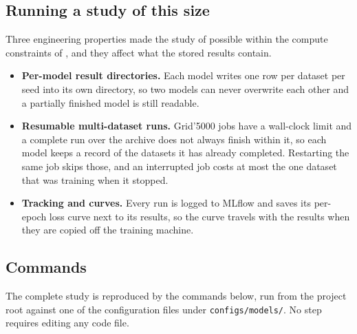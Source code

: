 
\subsection{Running a study of this size}
\label{app:engineering}

Three engineering properties made the study of  possible within the compute
constraints of , and they affect what the stored results contain.

\begin{itemize}\itemsep2pt
  \item \textbf{Per-model result directories.} Each model writes one row per dataset per seed into
        its own directory, so two models can never overwrite each other and a partially finished
        model is still readable.
  \item \textbf{Resumable multi-dataset runs.} Grid'5000 jobs have a wall-clock limit and a
        complete run over the archive does not always finish within it, so each model keeps a record of the datasets it has
        already completed. Restarting the same job skips those, and an interrupted job costs at most
        the one dataset that was training when it stopped.
  \item \textbf{Tracking and curves.} Every run is logged to MLflow and saves its per-epoch loss
        curve next to its results, so the curve travels with the results when they are copied off
        the training machine.
\end{itemize}

\subsection{Commands}
\label{app:commands}

The complete study is reproduced by the commands below, run from the project root against one of the
configuration files under \texttt{configs/models/}. No step requires editing any code file.

